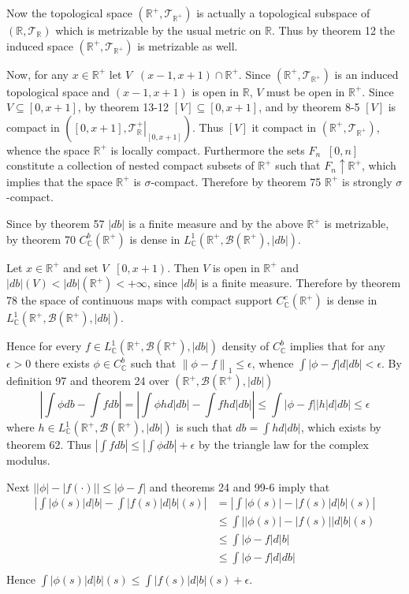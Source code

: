 \documentclass[a4paper]{article}
\newcommand{\clo}[1]{\left [ #1 \right ]}
\newcommand{\clop}[1]{\left [ #1 \right )}
\newcommand{\brac}[1]{\left ( #1 \right )}
\newcommand{\induc}[1]{\left . #1 \right \vert}
\newcommand{\abs}[1]{\left | #1 \right |}
\newcommand{\nrm}[1]{\left\| #1 \right \|}
\newcommand{\Real}{\mathbb{R}}
\newcommand{\Cplx}{\mathbb{C}}
\newcommand{\Tcal}{\mathcal{T}}
\newcommand{\borel}[1]{\mathcal{B}\brac{#1}}
\newcommand{\defn}{\mathop{\overset{\Delta}{=}}\nolimits}
\begin{document}
Now the topological space $\brac{\Real^+, \Tcal_{\Real^+}}$ is actually a topological subspace of $\brac{\Real, \Tcal_\Real}$ which is metrizable by the usual metric on $\Real$. Thus by theorem 12 the induced space $\brac{\Real^+, \Tcal_{\Real^+}}$ is metrizable as well.

Now, for any $x\in\Real^+$ let $V\defn \brac{x-1,x+1}\cap \Real^+$. Since $\brac{\Real^+, \Tcal_{\Real^+}}$ is an induced topological space and $\brac{x-1,x+1}$ is open in $\Real$, $V$ must be open in $\Real^+$. Since $V\subseteq \clo{0, x+1}$, by theorem 13-12 $\clo{V}\subseteq \clo{0, x+1}$, and by theorem 8-5 $\clo{V}$ is compact in $\brac{\clo{0, x+1}, \induc{\Tcal_\Real^+}_{\clo{0, x+1}}}$. Thus $\clo{V}$ it compact in $\brac{\Real^+,\Tcal_{\Real^+}}$, whence the space $\Real^+$ is locally compact. Furthermore the sets $F_n\defn \clo{0,n}$ constitute a collection of nested compact subsets of $\Real^+$ such that $F_n\uparrow \Real^+$, which implies that the space $\Real^+$ is $\sigma$-compact. Therefore by theorem 75 $\Real^+$ is strongly $\sigma$-compact.

Since by theorem 57 $\abs{db}$ is a finite measure and by the above $\Real^+$ is metrizable, by theorem 70 $C^b_\Cplx\brac{\Real^+}$ is dense in $L^1_\Cplx\brac{\Real^+, \borel{\Real^+}, \abs{db}}$.

Let $x\in \Real^+$ and set $V\defn \clop{0,x+1}$. Then $V$ is open in $\Real^+$ and $\abs{db}\brac{V}<\abs{db}\brac{\Real^+}<+\infty$, since $\abs{db}$ is a finite measure. Therefore by theorem 78 the space of continuous maps with compact support $C^c_\Cplx\brac{\Real^+}$ is dense in $L^1_\Cplx\brac{\Real^+, \borel{\Real^+}, \abs{db}}$.

Hence for every $f\in L^1_\Cplx\brac{\Real^+, \borel{\Real^+}, \abs{db}}$ density of $C^b_\Cplx$ implies that for any $\epsilon>0$ there exists $\phi\in C^b_\Cplx$ such that $\nrm{\phi-f}_1\leq\epsilon$, whence $\int \abs{\phi-f}d\abs{db}<\epsilon$. By definition 97 and theorem 24 over $\brac{\Real^+, \borel{\Real^+}, \abs{db}}$ \[\abs{\int \phi db -\int f db } = \abs{\int \phi h d\abs{db} -\int f h d\abs{db} } \leq \int \abs{\phi - f} \abs{h} d\abs{db} \leq \epsilon\] where $h\in L^1_\Cplx\brac{\Real^+, \borel{\Real^+}, \abs{db}}$ is such that $db = \int h d\abs{db}$, which exists by theorem 62. Thus $\abs{\int f db}\leq \abs{\int \phi db} + \epsilon$ by the triangle law for the complex modulus.

Next $\abs{\abs{\phi}-\abs{f\brac{\cdot}}}\leq \abs{\phi-f}$ and theorems 24 and 99-6 imply that \begin{align*}\abs{\int \abs{\phi\brac{s}} d\abs{b} - \int \abs{f\brac{s}} d\abs{b}\brac{s} }&= \abs{\int \abs{\phi\brac{s}} - \abs{f\brac{s}} d\abs{b}\brac{s} }\\&\leq \int \abs{\abs{\phi\brac{s}} - \abs{f\brac{s}}} d\abs{b}\brac{s}\\&\leq \int \abs{\phi - f} d\abs{b}\\&\leq \int \abs{\phi - f} d\abs{db}\\\end{align*} Hence $\int \abs{\phi\brac{s}} d\abs{b}\brac{s}\leq \int \abs{f\brac{s}} d\abs{b}\brac{s} + \epsilon$.
\end{document}
